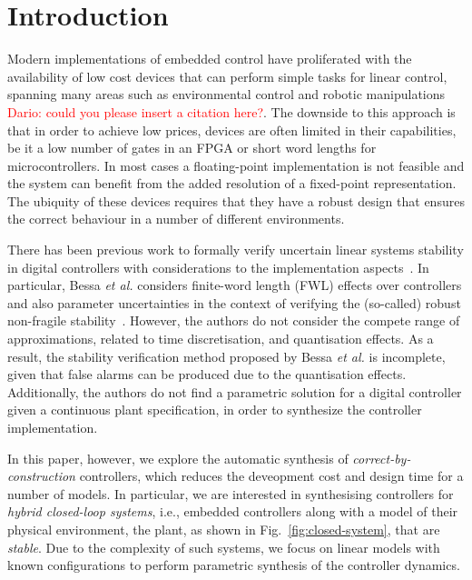 \documentclass{sig-alternate-05-2015}
\begin{document}
%
%
\printccsdesc




\section{Introduction}

Modern implementations of embedded control have proliferated with the
availability of low cost devices that can perform simple tasks for
linear control, spanning many areas such as environmental control and
robotic manipulations \textcolor{red}{Dario: could you please insert a citation here?}. 
The downside to this approach is that in order
to achieve low prices, devices are often limited in their
capabilities, be it a low number of gates in an FPGA or short word
lengths for microcontrollers. In most cases a floating-point
implementation is not feasible and the system can benefit from the
added resolution of a fixed-point representation. The ubiquity of
these devices requires that they have a robust design that ensures the
correct behaviour in a number of different environments.  %

There has been previous work to formally verify uncertain linear systems stability 
in digital controllers with considerations to the implementation aspects~\cite{Bessa16}.
In particular, Bessa {\it et al.} considers finite-word length
(FWL) effects over controllers and also parameter uncertainties
in the context of verifying the (so-called) robust non-fragile stability~\cite{bhattacharyya97}.
However, the authors do not consider the compete range of approximations, 
related to time discretisation, and quantisation effects. As a result,
the stability verification method proposed by Bessa {\it et al.} is incomplete, 
given that false alarms can be produced due to the quantisation effects. 
Additionally, the authors do not find a parametric solution for a digital controller 
given a continuous plant specification, in order to synthesize the controller implementation.

In this paper, however, we explore the automatic synthesis of 
{\em correct-by-construction} controllers, which 
reduces the deveopment cost and design time for a number of models.  
In particular, we are interested in synthesising controllers 
for {\em hybrid closed-loop systems}, i.e., embedded controllers along with a model of their
physical environment, the plant, as shown in
Fig.~\ref{fig:closed-system}, that are {\em stable}.  Due to the complexity
of such systems, we focus on linear models with known configurations
to perform parametric synthesis of the controller dynamics.
\end{document}
